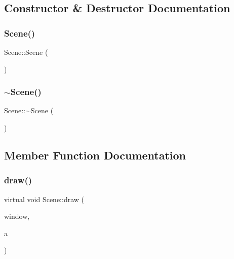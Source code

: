 \subsection{Constructor \& Destructor Documentation}
\mbox{\label{class_scene_ad10176d75a9cc0da56626f682d083507}} 
\subsubsection{\texorpdfstring{Scene()}{Scene()}}
{\footnotesize\ttfamily Scene\+::\+Scene (\begin{DoxyParamCaption}{ }\end{DoxyParamCaption})\hspace{0.3cm}{\ttfamily [inline]}}

\mbox{\label{class_scene_a3b8cec2e32546713915f8c6303c951f1}} 
\subsubsection{\texorpdfstring{$\sim$Scene()}{~Scene()}}
{\footnotesize\ttfamily Scene\+::$\sim$\+Scene (\begin{DoxyParamCaption}{ }\end{DoxyParamCaption})\hspace{0.3cm}{\ttfamily [inline]}}



\subsection{Member Function Documentation}
\mbox{\label{class_scene_aac0c632404668d9bf71755aaa9c35d51}} 
\subsubsection{\texorpdfstring{draw()}{draw()}}
{\footnotesize\ttfamily virtual void Scene\+::draw (\begin{DoxyParamCaption}\item[{sf\+::\+Render\+Window \&}]{window,  }\item[{float}]{a }\end{DoxyParamCaption})\hspace{0.3cm}{\ttfamily [pure virtual]}}



